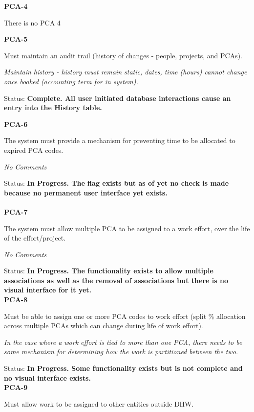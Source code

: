 \noindent \textbf{PCA-4}

\noindent There is no PCA 4

\noindent \textit{}

\noindent \textbf{PCA-5}

\noindent Must maintain an audit trail (history of changes - people, projects, and PCAs).

\noindent \textit{Maintain history - history must remain static, dates, time (hours) cannot change once booked (accounting term for in system).}

\noindent Status: \textbf{Complete.  All user initiated database interactions cause an entry into the History table.}

\noindent \textit{}

\noindent \textbf{PCA-6}

\noindent The system must provide a mechanism for preventing time to be allocated to expired PCA codes.

\textit{No Comments}

\noindent Status: \textbf{In Progress.  The flag exists but as of yet no check is made because no permanent user interface yet exists.}\\
\\
\noindent \textbf{PCA-7}

\noindent The system must allow multiple PCA to be assigned to a work effort, over the life of the effort/project.

\textit{No Comments}

\noindent Status: \textbf{In Progress.  The functionality exists to allow multiple associations as well as the removal of associations but there is no visual interface for it yet.}\\

\noindent \textbf{PCA-8}

\noindent Must be able to assign one or more PCA codes to work effort (split \% allocation across multiple PCAs which can change during life of work effort).

\noindent \textit{In the case where a work effort is tied to more than one PCA, there needs to be some mechanism for determining how the work is partitioned between the two.}

\noindent Status: \textbf{In Progress.  Some functionality exists but is not complete and no visual interface exists.}\\

\noindent \textbf{PCA-9}

\noindent Must allow work to be assigned to other entities outside DHW.

